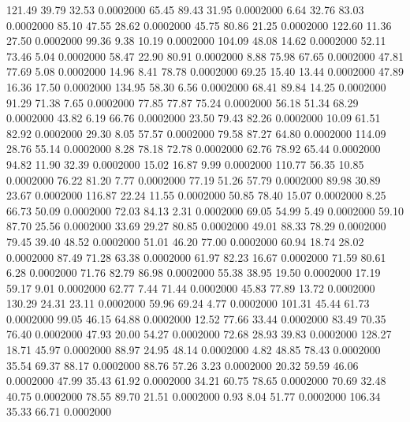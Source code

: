  121.49   39.79   32.53   0.0002000
  65.45   89.43   31.95   0.0002000
   6.64   32.76   83.03   0.0002000
  85.10   47.55   28.62   0.0002000
  45.75   80.86   21.25   0.0002000
 122.60   11.36   27.50   0.0002000
  99.36    9.38   10.19   0.0002000
 104.09   48.08   14.62   0.0002000
  52.11   73.46    5.04   0.0002000
  58.47   22.90   80.91   0.0002000
   8.88   75.98   67.65   0.0002000
  47.81   77.69    5.08   0.0002000
  14.96    8.41   78.78   0.0002000
  69.25   15.40   13.44   0.0002000
  47.89   16.36   17.50   0.0002000
 134.95   58.30    6.56   0.0002000
  68.41   89.84   14.25   0.0002000
  91.29   71.38    7.65   0.0002000
  77.85   77.87   75.24   0.0002000
  56.18   51.34   68.29   0.0002000
  43.82    6.19   66.76   0.0002000
  23.50   79.43   82.26   0.0002000
  10.09   61.51   82.92   0.0002000
  29.30    8.05   57.57   0.0002000
  79.58   87.27   64.80   0.0002000
 114.09   28.76   55.14   0.0002000
   8.28   78.18   72.78   0.0002000
  62.76   78.92   65.44   0.0002000
  94.82   11.90   32.39   0.0002000
  15.02   16.87    9.99   0.0002000
 110.77   56.35   10.85   0.0002000
  76.22   81.20    7.77   0.0002000
  77.19   51.26   57.79   0.0002000
  89.98   30.89   23.67   0.0002000
 116.87   22.24   11.55   0.0002000
  50.85   78.40   15.07   0.0002000
   8.25   66.73   50.09   0.0002000
  72.03   84.13    2.31   0.0002000
  69.05   54.99    5.49   0.0002000
  59.10   87.70   25.56   0.0002000
  33.69   29.27   80.85   0.0002000
  49.01   88.33   78.29   0.0002000
  79.45   39.40   48.52   0.0002000
  51.01   46.20   77.00   0.0002000
  60.94   18.74   28.02   0.0002000
  87.49   71.28   63.38   0.0002000
  61.97   82.23   16.67   0.0002000
  71.59   80.61    6.28   0.0002000
  71.76   82.79   86.98   0.0002000
  55.38   38.95   19.50   0.0002000
  17.19   59.17    9.01   0.0002000
  62.77    7.44   71.44   0.0002000
  45.83   77.89   13.72   0.0002000
 130.29   24.31   23.11   0.0002000
  59.96   69.24    4.77   0.0002000
 101.31   45.44   61.73   0.0002000
  99.05   46.15   64.88   0.0002000
  12.52   77.66   33.44   0.0002000
  83.49   70.35   76.40   0.0002000
  47.93   20.00   54.27   0.0002000
  72.68   28.93   39.83   0.0002000
 128.27   18.71   45.97   0.0002000
  88.97   24.95   48.14   0.0002000
   4.82   48.85   78.43   0.0002000
  35.54   69.37   88.17   0.0002000
  88.76   57.26    3.23   0.0002000
  20.32   59.59   46.06   0.0002000
  47.99   35.43   61.92   0.0002000
  34.21   60.75   78.65   0.0002000
  70.69   32.48   40.75   0.0002000
  78.55   89.70   21.51   0.0002000
   0.93    8.04   51.77   0.0002000
 106.34   35.33   66.71   0.0002000
